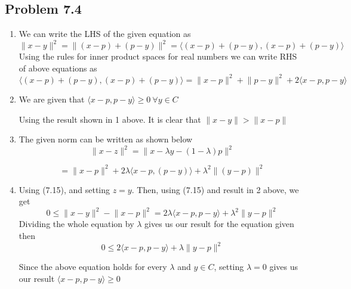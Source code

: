 \documentclass[letterpaper,12pt]{article}
\theoremstyle{definition}
\begin{document}
\subsection*{Problem 7.4}
\begin{enumerate}
    \item We can write the LHS of the given equation as
    \begin{equation*}
\lVert x-y \rVert^2 = \lVert (x-p)+(p-y) \rVert^2 = \langle (x-p)+(p-y), (x-p)+(p-y)\rangle
\end{equation*}
Using the rules for inner product spaces for real numbers we can write RHS of above equations as  
\begin{equation*}
 \langle (x-p)+(p-y), (x-p)+(p-y)\rangle =  \lVert x-p \rVert^2 +\lVert p-y \rVert^2 +2\langle x-p,p-y\rangle
\end{equation*}

    \item
    We are given that $\langle x-p,p-y\rangle \geq0 \ \forall y \in C$ 
    
    Using the result shown in 1 above. It is clear that $ \lVert x-y \rVert > \lVert x-p \rVert$
    \item
    The given norm can be written as shown below
    \begin{equation*}
  \lVert x-z \rVert^2= \lVert x-\lambda y -(1-\lambda)p \rVert^2
  \end{equation*}
  
   \begin{equation*}
   =
 \lVert x-p \rVert^2 +  2\lambda \langle x-p,(p-y)\rangle + \lambda^2 \lVert (y - p)\rVert^2 
\end{equation*}

    \item
Using (7.15), and setting $z=y$. Then, using (7.15) and result in 2 above, we get
\begin{equation*}
0 \leq \lVert x-y\rVert^2 - \lVert x-p\rVert^2 = 2\lambda \langle x-p, p-y\rangle + \lambda^2 \lVert y-p\rVert^2
\end{equation*}
Dividing the whole equation by $\lambda$ gives us our result for the equation given then 
\begin{equation*}
    0 \leq 2 \langle x-p,p-y \rangle + \lambda \lVert y-p \rVert^2 
\end{equation*}

Since the above equation holds for every $\lambda$ and $y \in C$, setting $\lambda=0$ gives us our result  $\langle x-p,p-y \rangle \geq 0$
\end{enumerate}
\end{document}
